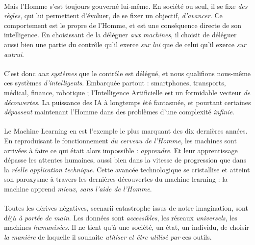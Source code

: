 \paragraph{} Mais l'Homme s'est toujours gouverné lui-même. En société ou seul, il se fixe
\emph{des règles}, qui lui permettent d'évoluer, de se fixer un objectif, \emph{d'avancer}.
Ce comportement est le propre de l'Homme, et est une conséquence directe de son intelligence.
En choisissant de la déléguer \emph{aux machines}, il choisit de déléguer aussi
bien une partie du contrôle qu'il exerce \emph{sur lui} que de celui qu'il exerce \emph{sur autrui}.

\paragraph{} C'est donc \emph{aux systèmes} que le contrôle est délégué, et nous qualifions
nous-même ces systèmes \emph{d'intelligents}. Embarquée partout : smartphones, transports,
médical, finance, robotique ; l'Intelligence Artificielle est un formidable vecteur
\emph{de découvertes}. La puissance des IA à longtemps été fantasmée, et pourtant 
certaines \emph{dépassent} maintenant l'Homme dans des problèmes d'une complexité \emph{infinie}. 

\paragraph{} Le Machine Learning en est l'exemple le plus marquant des dix dernières
années. En reproduisant le fonctionnement \emph{du cerveau de l'Homme}, les machines sont
arrivées à faire ce qui était alors impossible : \emph{apprendre}. Et leur apprentissage
dépasse les attentes humaines, aussi bien dans la vitesse de progression que dans la
\emph{réelle application technique}. Cette avancée technologique se cristallise et 
atteint son paroxysme à travers les dernières découvertes du machine learning : la
machine apprend \emph{mieux, sans l'aide de l'Homme}. 

\paragraph{} Toutes les dérives négatives, scenarii catastrophe issus de notre imagination,
sont déjà \emph{à portée de main}. Les données sont \emph{accessibles}, les réseaux \emph{universels},
les machines \emph{humanisées}. Il ne tient qu'à une société, un état, un
individu, de choisir \emph{la manière} de laquelle il souhaite \emph{utiliser et être
utilisé par} ces outils.

